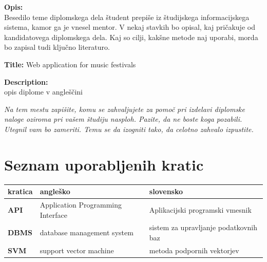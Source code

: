 \documentclass[a4paper,12pt,openright]{book}
\newcommand{\clearemptydoublepage}{\newpage{\pagestyle{empty}\cleardoublepage}}
\begin{document}
\bigskip
\noindent\textbf{Opis:}\\
Besedilo teme diplomskega dela študent prepiše iz študijskega informacijskega sistema, kamor ga je vnesel mentor. 
V nekaj stavkih bo opisal, kaj pričakuje od kandidatovega diplomskega dela. 
Kaj so cilji, kakšne metode naj uporabi, morda bo zapisal tudi ključno literaturo.

\bigskip
\noindent\textbf{Title:} Web application for music festivals

\bigskip
\noindent\textbf{Description:}\\
opis diplome v angleščini

\vfill



\vspace{2cm}

\clearemptydoublepage

\thispagestyle{empty}\mbox{}\vfill\null\it%
\noindent
Na tem mestu zapišite, komu se zahvaljujete za pomoč pri izdelavi diplomske naloge oziroma pri vašem študiju nasploh. Pazite, da ne boste koga pozabili. Utegnil vam bo zameriti. Temu se da izogniti tako, da celotno zahvalo izpustite.
\rm\normalfont

\clearemptydoublepage


\pagestyle{empty}
\def\thepage{}%
\tableofcontents{}


\clearemptydoublepage


\chapter*{Seznam uporabljenih kratic}

\noindent\begin{tabular}{p{}|p{}|p{}}    %
  {\bf kratica} & {\bf angleško}                              & {\bf slovensko} \\ \hline
  {\bf API}      & Application Programming Interface               & Aplikacijski programski vmesnik \\
  {\bf DBMS} & database management system & sistem za upravljanje podatkovnih baz \\
  {\bf SVM}   & support vector machine              & metoda podpornih vektorjev \\
\end{tabular}
\end{document}
